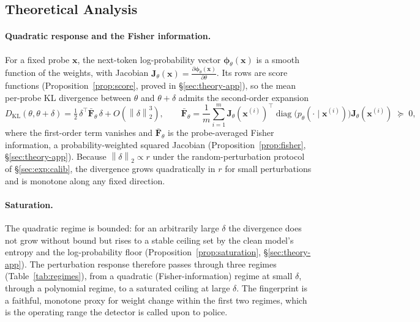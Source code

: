 \documentclass[11pt]{article}
\newcommand{\norm}[1]{\left\lVert #1 \right\rVert}
\theoremstyle{definition}
\begin{document}
\subsection{Theoretical Analysis}
\label{sec:theory}


\paragraph{Quadratic response and the Fisher information.}
For a fixed probe $\bm{x}$, the next-token log-probability vector
$\bm{\phi}_\theta(\bm{x})$ is a smooth function of the weights, with Jacobian
$\bm{J}_\theta(\bm{x}) = \frac{\partial \bm{\phi}_\theta(\bm{x})}{\partial
\theta}$. Its rows are score functions (Proposition~\ref{prop:score}, proved
in \S\ref{sec:theory-app}), so the mean per-probe KL divergence between
$\theta$ and $\theta + \delta$ admits the second-order expansion
\begin{equation}
  D_{\mathrm{KL}}(\theta, \theta+\delta)
  = \tfrac12\, \delta^\top \bar{\bm{F}}_\theta\, \delta
    + O(\norm{\delta}_2^3),
  \qquad
  \bar{\bm{F}}_\theta = \frac1m \sum_{i=1}^m
    \bm{J}_\theta(\bm{x}^{(i)})^\top
    \operatorname{diag}\!\big(p_\theta(\cdot \mid \bm{x}^{(i)})\big)
    \bm{J}_\theta(\bm{x}^{(i)})
  \;\succeq\; 0,
  \label{eq:dklexpand}
\end{equation}
where the first-order term vanishes and $\bar{\bm{F}}_\theta$ is the
probe-averaged Fisher information, a probability-weighted squared Jacobian
(Proposition~\ref{prop:fisher}, \S\ref{sec:theory-app}). Because
$\norm{\delta}_2 \propto r$ under the random-perturbation protocol of
\S\ref{sec:exp:calib}, the divergence grows quadratically in $r$ for small
perturbations and is monotone along any fixed direction.

\paragraph{Saturation.}
The quadratic regime is bounded: for an arbitrarily large $\delta$ the
divergence does not grow without bound but rises to a stable ceiling set by the
clean model's entropy and the log-probability floor
(Proposition~\ref{prop:saturation}, \S\ref{sec:theory-app}). The perturbation
response therefore passes through three regimes
(Table~\ref{tab:regimes}), from a quadratic (Fisher-information) regime at
small $\delta$, through a polynomial regime, to a saturated ceiling at large
$\delta$. The fingerprint is a faithful, monotone proxy for weight change
within the first two regimes, which is the operating range the detector is
called upon to police.
\end{document}
